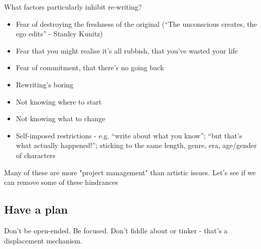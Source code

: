 \documentclass[11pt]{article}
\begin{document}


What factors particularly inhibit re-writing?
\begin{itemize}
\item Fear of destroying the freshness of the original (``The unconscious creates, the ego edits'' - Stanley Kunitz)
\item Fear that you might realise it's all rubbish, that you've wasted your life
\item Fear of commitment, that there's no going back
\item Rewriting's boring
\item Not knowing where to start
\item Not knowing what to change
\item Self-imposed restrictions - e.g. ``write about what you know''; ``but that's what actually happened!''; sticking to the same length, genre, era, age/gender of characters
\end{itemize}
Many of these are more "project management" than artistic issues. Let's see if we can remove some of these hindrances

\subsection*{Have a plan}
Don't be open-ended. Be focused. Don't fiddle about or tinker - that's a displacement mechanism.
\end{document}
